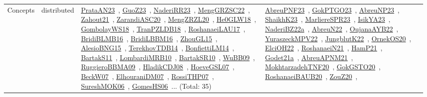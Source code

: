 {\begin{longtable}{lp{3cm}>{\raggedright\arraybackslash}p{6cm}>{\raggedright\arraybackslash}p{6cm}>{\raggedright\arraybackslash}p{8cm}}
Concepts & distributed & \href{../works/PrataAN23.pdf}{PrataAN23}~\cite{PrataAN23}, \href{../works/GuoZ23.pdf}{GuoZ23}~\cite{GuoZ23}, \href{../works/NaderiRR23.pdf}{NaderiRR23}~\cite{NaderiRR23}, \href{../works/MengGRZSC22.pdf}{MengGRZSC22}~\cite{MengGRZSC22}, \href{../works/Zahout21.pdf}{Zahout21}~\cite{Zahout21}, \href{../works/ZarandiASC20.pdf}{ZarandiASC20}~\cite{ZarandiASC20}, \href{../works/MengZRZL20.pdf}{MengZRZL20}~\cite{MengZRZL20}, \href{../works/He0GLW18.pdf}{He0GLW18}~\cite{He0GLW18}, \href{../works/GombolayWS18.pdf}{GombolayWS18}~\cite{GombolayWS18}, \href{../works/TranPZLDB18.pdf}{TranPZLDB18}~\cite{TranPZLDB18}, \href{../works/RoshanaeiLAU17.pdf}{RoshanaeiLAU17}~\cite{RoshanaeiLAU17}, \href{../works/BridiBLMB16.pdf}{BridiBLMB16}~\cite{BridiBLMB16}, \href{../works/BridiLBBM16.pdf}{BridiLBBM16}~\cite{BridiLBBM16}, \href{../works/ZhouGL15.pdf}{ZhouGL15}~\cite{ZhouGL15}, \href{../works/AlesioBNG15.pdf}{AlesioBNG15}~\cite{AlesioBNG15}, \href{../works/TerekhovTDB14.pdf}{TerekhovTDB14}~\cite{TerekhovTDB14}, \href{../works/BonfiettiLM14.pdf}{BonfiettiLM14}~\cite{BonfiettiLM14}, \href{../works/BartakS11.pdf}{BartakS11}~\cite{BartakS11}, \href{../works/LombardiMRB10.pdf}{LombardiMRB10}~\cite{LombardiMRB10}, \href{../works/BartakSR10.pdf}{BartakSR10}~\cite{BartakSR10}, \href{../works/WuBB09.pdf}{WuBB09}~\cite{WuBB09}, \href{../works/RuggieroBBMA09.pdf}{RuggieroBBMA09}~\cite{RuggieroBBMA09}, \href{../works/HladikCDJ08.pdf}{HladikCDJ08}~\cite{HladikCDJ08}, \href{../works/HoeveGSL07.pdf}{HoeveGSL07}~\cite{HoeveGSL07}, \href{../works/BeckW07.pdf}{BeckW07}~\cite{BeckW07}, \href{../works/ElhouraniDM07.pdf}{ElhouraniDM07}~\cite{ElhouraniDM07}, \href{../works/RossiTHP07.pdf}{RossiTHP07}~\cite{RossiTHP07}, \href{../works/SureshMOK06.pdf}{SureshMOK06}~\cite{SureshMOK06}, \href{../works/GomesHS06.pdf}{GomesHS06}~\cite{GomesHS06}... (Total: 35) & \href{../works/AbreuPNF23.pdf}{AbreuPNF23}~\cite{AbreuPNF23}, \href{../works/GokPTGO23.pdf}{GokPTGO23}~\cite{GokPTGO23}, \href{../works/AbreuNP23.pdf}{AbreuNP23}~\cite{AbreuNP23}, \href{../works/ShaikhK23.pdf}{ShaikhK23}~\cite{ShaikhK23}, \href{../works/MarliereSPR23.pdf}{MarliereSPR23}~\cite{MarliereSPR23}, \href{../works/IsikYA23.pdf}{IsikYA23}~\cite{IsikYA23}, \href{../works/NaderiBZ22a.pdf}{NaderiBZ22a}~\cite{NaderiBZ22a}, \href{../works/AbreuN22.pdf}{AbreuN22}~\cite{AbreuN22}, \href{../works/OujanaAYB22.pdf}{OujanaAYB22}~\cite{OujanaAYB22}, \href{../works/YuraszeckMPV22.pdf}{YuraszeckMPV22}~\cite{YuraszeckMPV22}, \href{../works/JungblutK22.pdf}{JungblutK22}~\cite{JungblutK22}, \href{../works/OrnekOS20.pdf}{OrnekOS20}~\cite{OrnekOS20}, \href{../works/ElciOH22.pdf}{ElciOH22}~\cite{ElciOH22}, \href{../works/RoshanaeiN21.pdf}{RoshanaeiN21}~\cite{RoshanaeiN21}, \href{../works/HamP21.pdf}{HamP21}~\cite{HamP21}, \href{../works/Godet21a.pdf}{Godet21a}~\cite{Godet21a}, \href{../works/AbreuAPNM21.pdf}{AbreuAPNM21}~\cite{AbreuAPNM21}, \href{../works/MokhtarzadehTNF20.pdf}{MokhtarzadehTNF20}~\cite{MokhtarzadehTNF20}, \href{../works/GokGSTO20.pdf}{GokGSTO20}~\cite{GokGSTO20}, \href{../works/RoshanaeiBAUB20.pdf}{RoshanaeiBAUB20}~\cite{RoshanaeiBAUB20}, \href{../works/ZouZ20.pdf}{ZouZ20}~\cite{ZouZ20}, 
\end{longtable}}
